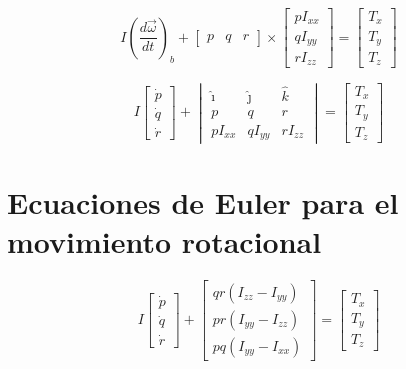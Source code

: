 \documentclass[11pt,a4paper]{article}
\begin{document}
\begin{equation*}
I\left(\dfrac{d\vec\omega}{dt}\right)_b + 
\begin{bmatrix} p & q & r \end{bmatrix} \times
\begin{bmatrix} pI_{xx} \\ qI_{yy} \\ rI_{zz} \end{bmatrix}
=
\begin{bmatrix} T_x \\ T_y \\ T_z \end{bmatrix}
\end{equation*}

\begin{equation*}
I
\begin{bmatrix} \dot p \\ \dot q \\ \dot r \end{bmatrix}
+
\begin{vmatrix}
\hat\imath & \hat\jmath & \hat k \\
p & q & r \\
pI_{xx} & qI_{yy} & rI_{zz}
\end{vmatrix}
=
\begin{bmatrix} T_x \\ T_y \\ T_z \end{bmatrix}
\end{equation*}

\section{Ecuaciones de Euler para el movimiento rotacional}

\begin{equation*}
I
\begin{bmatrix} \dot p \\ \dot q \\ \dot r \end{bmatrix}
+
\begin{bmatrix}
qr(I_{zz}-I_{yy}) \\
pr(I_{yy}-I_{zz}) \\
pq(I_{yy}-I_{xx})
\end{bmatrix}
=
\begin{bmatrix} T_x \\ T_y \\ T_z \end{bmatrix}
\end{equation*}
\end{document}
